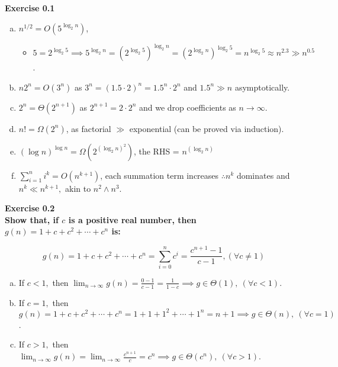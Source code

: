 \documentclass{article}
\newenvironment{problem}[2][Exercise]
    { \begin{mdframed}[backgroundcolor=gray!20] \textbf{#1 #2} \\}
    {  \end{mdframed}}
\begin{document}
\begin{problem}{0.1}
\begin{enumerate}[(a)]
        \item $n^{1/2}=O(5^{\log_2 n})$, 
            \begin{itemize}
                \item $5=2^{\log_2 5}\implies5^{\log_2 n}
                    =(2^{\log_2 5})^{\log_2 n}
                    =(2^{\log_2 n})^{\log_2 5}
                    =n^{\log_2 5}\approx n^{2.3}\gg n^{0.5}$.
            \end{itemize}
        \item $n2^n=O(3^n)$ as $3^n = (1.5 \cdot 2)^n = 1.5^n \cdot 2^n$ and $1.5^n \gg n$ asymptotically.
        \item $2^n=\Theta(2^{n+1})$ as $2^{n+1}=2\cdot2^{n}$ and we drop coefficients as $n\to\infty$.
        \item $n!=\Omega(2^n)$, as factorial $\gg$ exponential (can be proved via induction).
        \item $(\log n)^{\log n}=\Omega(2^{{(\log_2 n)}^2})$, the RHS = $n^{(\log_2 n)}$
        \item $\displaystyle\sum_{i=1}^n i^k = O(n^{k+1})$, each summation term increases $\therefore n^k$ dominates and $n^k\ll n^{k+1},$ akin to $n^2\land n^3$.
    \end{enumerate}
\end{problem}

\newpage
\begin{problem}{0.2}
    \textbf{Show that, if $c$ is a positive real number, then $g(n) = 1 + c + c^2 + \cdots + c^n$ is:}

    \[
        g(n) 
        = 1 + c + c^2 + \cdots + c^n 
        = \displaystyle\sum_{i=0}^n c^i
        = \frac{c^{n+1}-1}{c-1}, 
        (\forall c\neq 1)
    \]

    \begin{enumerate}[(a)]
        \item If $c<1,$ 
        then $\displaystyle\lim_{n\to\infty}g(n)
        =\frac{0-1}{c-1}
        =\frac{1}{1-c}
        \implies \boxed{g\in\Theta(1),} \  (\forall c < 1)$.
        \item If $c=1,$ 
        then $g(n) 
        = 1 + c + c^2 + \cdots + c^n
        = 1 + 1 + 1^2 + \cdots + 1^n
        = n + 1
        \implies \boxed{g\in\Theta(n),} \  (\forall c=1)$.
        \item If $c>1,$ 
        then $\displaystyle\lim_{n\to\infty}g(n)
        =\lim_{n\to\infty}\frac{c^{n+1}}{c}
        = c^n
        \implies \boxed{g\in\Theta(c^n),} \  (\forall c > 1)$.
    \end{enumerate}
\end{problem}
\end{document}

